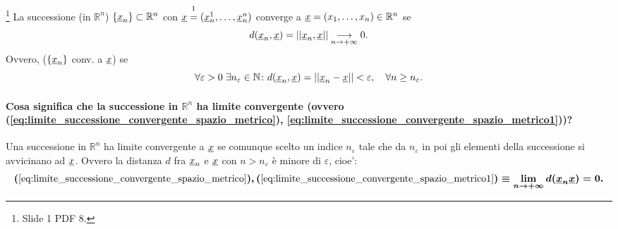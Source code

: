 \begin{definition}\label{def:successione_convergente_AN2}\footnote{Slide 1 PDF 8.}
    La successione (in $\mathbb R^n$) $\{\uline x_n\}\subset\mathbb R^n$ con $\uline x\overset{\footnotemark}{=}(\uline x_n^1,\hdots,\uline x_n^n)$ converge a $\uline x=(x_1,\hdots,x_n)\in\mathbb R^n$ se
    \begin{equation}\label{eq:limite_successione_convergente_spazio_metrico}
         d(\uline x_n,\uline x)=||\uline x_n,\uline x||\underset{n\rightarrow+\infty}{\longrightarrow}0.
    \end{equation}
    Ovvero, ($\{\uline x_n\}$ conv. a $\uline x$) se
    \begin{equation}\label{eq:limite_successione_convergente_spazio_metrico1}
        \forall\varepsilon>0\;\exists n_\varepsilon \in\mathbb N\colon d(\uline x_n,\uline x) = ||\uline x_n-\uline x||<\varepsilon,\quad \forall n\geq n_\varepsilon.
    \end{equation}
\end{definition}

\paragraph{Cosa significa che la successione in $\mathbb R^n$ ha limite convergente (ovvero (\ref{eq:limite_successione_convergente_spazio_metrico}), \ref{eq:limite_successione_convergente_spazio_metrico1}))?} Una successione in $\mathbb R^n$ ha limite convergente a $\uline x$ se comunque scelto un indice $n_\varepsilon$ tale che da $n_\varepsilon$ in poi gli elementi della successione si avvicinano ad $\uline x$. Ovvero la distanza $d$ fra $\uline x_n$ e $\uline x$ con $n>n_\varepsilon$ è minore di $\varepsilon$, cioe':
\begin{equation*}
    \boldsymbol{(\ref{eq:limite_successione_convergente_spazio_metrico}),(\ref{eq:limite_successione_convergente_spazio_metrico1})\equiv\lim_{n\rightarrow+\infty}d(\uline x_n\uline x)=0.}
\end{equation*}

